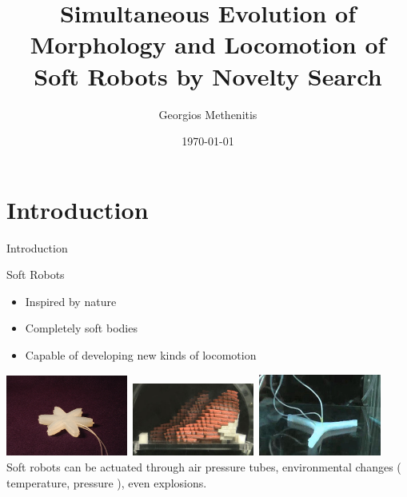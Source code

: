 \documentclass{beamer}
\title[Simultaneous Evolution of Morphology and Locomotion of Soft Robots by Novelty Search]{Simultaneous Evolution of Morphology and Locomotion of Soft Robots by Novelty Search}
\author{Georgios Methenitis}
\institute{UvA, ACT}
\date{\today}
\begin{document}
\begin{frame}
  \titlepage
\end{frame}




\section{Introduction}




\begin{frame}{Introduction}
\begin{block}{Soft Robots}
\begin{itemize}
\item Inspired by nature
\item Completely soft bodies
\item Capable of developing new kinds of locomotion
\end{itemize}
\end{block}
\includegraphics[width=0.3\textwidth,height=0.25\textheight]{../Figures/Misc/soft_robotics_figure.png}\		
\includegraphics[width=0.3\textwidth,height=0.25\textheight]{../Figures/Misc/hillerPressureChamber.png}\	
\includegraphics[width=0.3\textwidth,height=0.25\textheight]{../Figures/Misc/ExplodingRobot.jpg}\\
\vspace{0.3cm}
Soft robots can be actuated through air pressure tubes, environmental changes ( temperature, pressure ), even explosions.
\end{frame}
\end{document}
